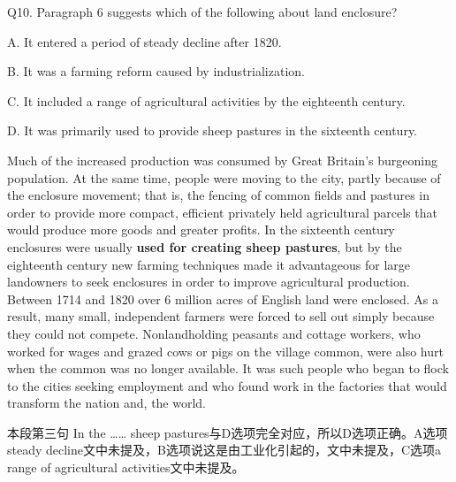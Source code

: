 \begin{blk}
    \begin{qst}
        Q10. Paragraph 6 suggests which of the following about land enclosure?
    \end{qst}

    \begin{chc}
        A. It entered a period of steady decline after 1820.

        B. It was a farming reform caused by industrialization.

        C. It included a range of agricultural activities by the eighteenth century.

        D. It was primarily used to provide sheep pastures in the sixteenth century.
    \end{chc}

    \begin{psgq}
        Much of the increased production was consumed by Great Britain’s burgeoning population. At the same time, people were moving to the city, partly because of the enclosure movement; that is, the fencing of common fields and pastures in order to provide more compact, efficient privately held agricultural parcels that would produce more goods and greater profits. In the sixteenth century enclosures were usually \textbf{used for creating sheep pastures}, but by the eighteenth century new farming techniques made it advantageous for large landowners to seek enclosures in order to improve agricultural production. Between 1714 and 1820 over 6 million acres of English land were enclosed. As a result, many small, independent farmers were forced to sell out simply because they could not compete. Nonlandholding peasants and cottage workers, who worked for wages and grazed cows or pigs on the village common, were also hurt when the common was no longer available. It was such people who began to flock to the cities seeking employment and who found work in the factories that would transform the nation and, the world.
    \end{psgq}

    \begin{nlz}
        本段第三句 In the …… sheep pastures与D选项完全对应，所以D选项正确。A选项steady decline文中未提及，B选项说这是由工业化引起的，文中未提及，C选项a range of agricultural activities文中未提及。
    \end{nlz}
\end{blk}

